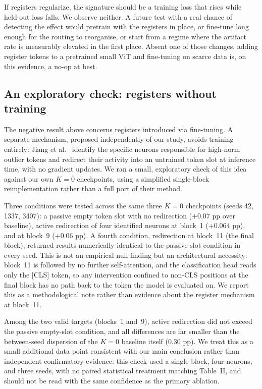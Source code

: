 If registers regularize, the signature should be a training loss that rises
while held-out loss falls. We observe neither. A future test with a real chance
of detecting the effect would pretrain with the registers in place, or fine-tune
long enough for the routing to reorganise, or start from a regime where the
artifact rate is measurably elevated in the first place. Absent one of those
changes, adding register tokens to a pretrained small ViT and fine-tuning on
scarce data is, on this evidence, a no-op at best.

\subsection{An exploratory check: registers without training}

The negative result above concerns registers introduced via fine-tuning. A
separate mechanism, proposed independently of our study, avoids training
entirely: Jiang et al.~\cite{jiang2025} identify the specific neurons
responsible for high-norm outlier tokens and redirect their activity into an
untrained token slot at inference time, with no gradient updates. We ran a
small, exploratory check of this idea against our own $K=0$ checkpoints, using
a simplified single-block reimplementation rather than a full port of their
method.

Three conditions were tested across the same three $K=0$ checkpoints (seeds
42, 1337, 3407): a passive empty token slot with no redirection ($+0.07$ pp
over baseline), active redirection of four identified neurons at block~1
($+0.064$ pp), and at block~9 ($+0.06$ pp). A fourth condition, redirection at
block~11 (the final block), returned results numerically identical to the
passive-slot condition in every seed. This is not an empirical null finding
but an architectural necessity: block~11 is followed by no further
self-attention, and the classification head reads only the [CLS] token, so
any intervention confined to non-CLS positions at the final block has no path
back to the token the model is evaluated on. We report this as a
methodological note rather than evidence about the register mechanism at
block~11.

Among the two valid targets (blocks~1 and~9), active redirection did not
exceed the passive empty-slot condition, and all differences are far smaller
than the between-seed dispersion of the $K=0$ baseline itself ($0.30$ pp). We
treat this as a small additional data point consistent with our main
conclusion rather than independent confirmatory evidence: this check used a
single block, four neurons, and three seeds, with no paired statistical
treatment matching Table~II, and should not be read with the same confidence
as the primary ablation.

